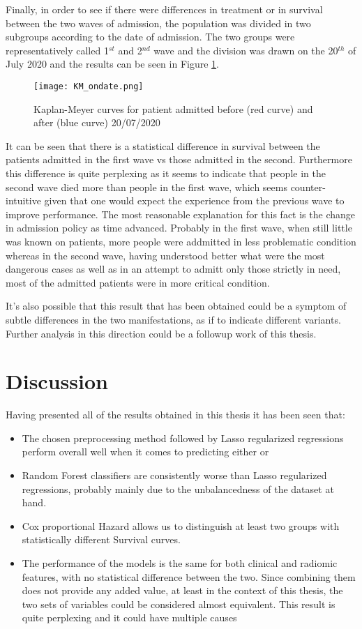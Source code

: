 Finally, in order to see if there were differences in treatment or in survival between the two waves of admission, the population was divided in two subgroups according to the date of admission. 
The two groups were representatively called 1$^{st}$ and 2$^{nd}$ wave and the division was drawn on the 20$^{th}$ of July 2020 and the results can be seen in Figure \ref{fig:kmwaves}.

\begin{figure}
\texttt{[image: KM\_ondate.png]}
\caption{Kaplan-Meyer curves for patient admitted before (red curve) and after (blue curve) 20/07/2020 \label{fig:kmwaves}}
\end{figure}

It can be seen that there is a statistical difference in survival between the patients admitted in the first wave vs those admitted in the second. 
Furthermore this difference is quite perplexing as it seems to indicate that people in the second wave died more than people in the first wave, which seems counter-intuitive given that one would expect the experience from the previous wave to improve performance.
The most reasonable explanation for this fact is the change in admission policy as time advanced.
Probably in the first wave, when still little was known on \covid patients, more people were addmitted in less problematic condition whereas in the second wave, having understood better what were the most dangerous cases as well as in an attempt to admitt only those  strictly in need, most of the admitted patients were in more critical condition.

It's also possible that this result that has been obtained could be a symptom of subtle differences in the two \covid manifestations, as if to indicate different variants.
Further analysis in this direction could be a followup work of this thesis.

\chapter{Discussion}
Having presented all of the results obtained in this thesis it has been seen that:

\begin{itemize}
\item The chosen preprocessing method followed by Lasso regularized regressions perform overall well when it comes to predicting either \death or \icu
\item Random Forest classifiers are consistently worse than Lasso regularized regressions, probably mainly due to the unbalancedness of the dataset at hand.
\item Cox proportional Hazard allows us to distinguish at least two groups with statistically different Survival curves.
\item The performance of the models is the same for both clinical and radiomic features, with no statistical difference between the two. Since combining them does not provide any added value, at least in the context of this thesis, the two sets of variables could be considered almost equivalent.
This result is quite perplexing and it could have multiple causes
\end{itemize}


